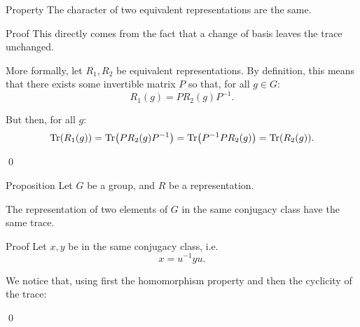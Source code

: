 \documentclass[a4paper]{article}
\begin{document}
\begin{parag}{Property}
    The character of two equivalent representations are the same.

    \begin{subparag}{Proof}
        This directly comes from the fact that a change of basis leaves the trace unchanged.

        More formally, let $R_1, R_2$ be equivalent representations. By definition, this means that there exists some invertible matrix $P$ so that, for all $g \in G$:
        \[R_1\left(g\right) = P R_2\left(g\right) P^{-1}.\]

        But then, for all $g$: 
        \[\Tr\left(R_1\left(g\right)\right) = \Tr\left(P R_2\left(g\right) P^{-1}\right) = \Tr\left(P^{-1} P R_2\left(g\right)\right) = \Tr\left(R_2\left(g\right)\right).\]

        \qed
    \end{subparag}
\end{parag}


\begin{parag}{Proposition}
    Let $G$ be a group, and $R$ be a representation.

    The representation of two elements of $G$ in the same conjugacy class have the same trace. 

    \begin{subparag}{Proof}
        Let $x, y$ be in the same conjugacy class, i.e. 
        \[x = u^{-1} y u.\]

        We notice that, using first the homomorphism property and then the cyclicity of the trace: 
        
        \qed
    \end{subparag}
\end{parag}
\end{document}
